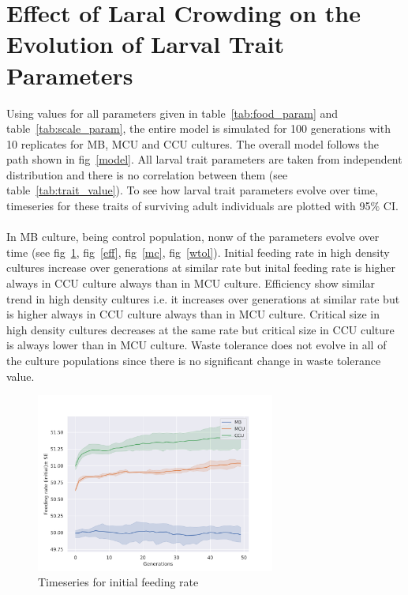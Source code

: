 \newpage
\section{Effect of Laral Crowding on the Evolution of Larval Trait Parameters}
Using values for all parameters given in table~\ref{tab:food_param} and table~\ref{tab:scale_param}, the entire model is simulated for 100 generations with 10 replicates for MB, MCU and CCU cultures. The overall model follows the path shown in fig~\ref{model}. All larval trait parameters are taken from independent distribution and there is no correlation between them (see table~\ref{tab:trait_value}). To see how larval trait parameters evolve over time, timeseries for these traits of surviving adult individuals are plotted with 95$\%$ CI.\\ \\
In MB culture, being control population, nonw of the parameters evolve over time (see fig~\ref{fr}, fig~\ref{eff}, fig~\ref{mc}, fig~\ref{wtol}). Initial feeding rate in high density cultures increase over generations at similar rate but inital feeding rate is higher always in CCU culture always than in MCU culture. Efficiency show similar trend in high density cultures i.e. it increases over generations at similar rate but is higher always in CCU culture always than in MCU culture. Critical size in high density cultures decreases at the same rate but critical size in CCU culture is always lower than in MCU culture. Waste tolerance does not evolve in all of the culture populations since there is no significant change in waste tolerance value.
\begin{figure}[h]
  \centering
  \includegraphics[trim = 0 0 50 50, clip, width=0.7\textwidth]{C4/Figs/fr}
  \caption{Timeseries for initial feeding rate}
  \label{fr}
\end{figure}

